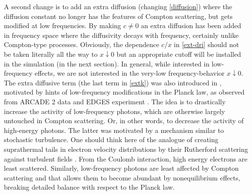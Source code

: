 \documentclass[a4paper,12pt,reqno,superscriptaddress,nofootinbib]{revtex4}
\newcommand{\0}{^{(0)}}
\newcommand{\1}{^{(1)}}
\newcommand{\2}{^{(2)}}
\begin{document}
A second  change is to add an extra diffusion (changing \eqref{diffusion}) where the diffusion constant no longer has the features of Compton scattering, but gets modified at low frequencies. By making $c\neq 0$ an extra diffusion has been added in frequency space where the diffusivity decays with frequency, certainly unlike Compton-type processes.  Obviously, the dependence $c/x$ in \eqref{ext-dri} should not be taken literally all the way to $x\downarrow 0$ but an appropriate cutoff will be installed in the simulation (in the next section). In general, while interested in low-frequency effects, we are not interested in the very-low frequency-behavior $x\downarrow 0$. The extra diffusive term (the last term in \eqref{extk}) was also introduced in \cite{arca}, motivated by hints of low-frequency modifications in the Planck law, as observed from ARCADE 2 data \cite{arcade1,arcade2} and EDGES experiment \cite{edges}. The idea is to drastically increase the activity of low-frequency photons, which are otherwise largely untouched in Compton scattering.  Or, in other words, to decrease the activity of high-energy photons.  The latter was motivated by a mechanism similar to stochastic turbulence.  One should think here of the analogue of creating suprathermal tails in electron velocity distributions by their Rutherford scattering against turbulent fields \cite{supra1,banerjee}.  From the Coulomb interaction, high energy electrons are least scattered.  Similarly, low-frequency photons are least affected by Compton scattering and that allows them to become abundant by nonequilibrium effects, breaking detailed balance with respect to the Planck law.\\
\end{document}

